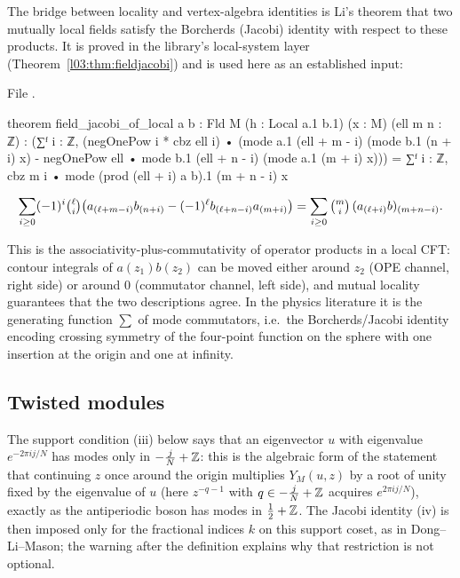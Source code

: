 The bridge between locality and vertex-algebra identities is Li's theorem that two mutually local
fields satisfy the Borcherds (Jacobi) identity with respect to these products. It is proved in
the library's local-system layer (Theorem~\ref{l03:thm:fieldjacobi}) and is used here as an established input:

\noindent File .
\begin{leancode}
theorem field_jacobi_of_local {a b : Fld M} (h : Local a.1 b.1)
    (x : M) (ell m n : ℤ) :
    (∑ᶠ i : ℤ, (negOnePow i * cbz ell i) •
      (mode a.1 (ell + m - i) (mode b.1 (n + i) x) -
        negOnePow ell • mode b.1 (ell + n - i) (mode a.1 (m + i) x))) =
      ∑ᶠ i : ℤ, cbz m i • mode (prod (ell + i) a b).1 (m + n - i) x
\end{leancode}

\begin{equation}\label{ch07:eq:fieldjacobi}
  \sum_{i\ge0}(-1)^i\tbinom{\ell}{i}\bigl(a_{(\ell+m-i)}b_{(n+i)} - (-1)^\ell
  b_{(\ell+n-i)}a_{(m+i)}\bigr) = \sum_{i\ge 0}\tbinom{m}{i}\,(a_{(\ell+i)}b)_{(m+n-i)}.
\end{equation}

\begin{physics}
This is the associativity-plus-commutativity of operator products in a local CFT: contour integrals of $a(z_1)b(z_2)$ can be moved either around $z_2$ (OPE channel, right side) or around $0$ (commutator channel, left side), and mutual locality guarantees that the two descriptions agree. In the physics literature it is the generating function $\sum$ of mode commutators, i.e.\ the Borcherds/Jacobi identity encoding crossing symmetry of the four-point function on the sphere with one insertion at the origin and one at infinity.
\end{physics}

\subsection{Twisted modules}\label{ch07:sec:twmod}

The support condition (iii) below says that an eigenvector $u$ with eigenvalue
$e^{-2\pi ij/N}$ has modes only in $-\frac jN+{\mathbb{Z}}$: this is the algebraic form of the statement that
continuing $z$ once around the origin multiplies $Y_M(u,z)$ by a root of unity fixed by the
eigenvalue of $u$ (here $z^{-q-1}$ with $q\in-\frac jN+{\mathbb{Z}}$ acquires $e^{2\pi ij/N}$), exactly as the antiperiodic
boson has modes in $\frac12+{\mathbb{Z}}$. The Jacobi identity (iv) is then imposed only for the fractional
indices $k$ on this support coset, as in Dong--Li--Mason; the warning after the definition
explains why that restriction is not optional.

